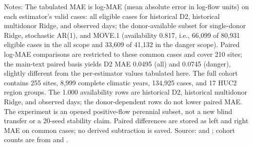 \begin{table}[t]
\centering
\small
\caption{Opened flow-comparator scorecard for the crossed family. Availability is the fraction of eligible cases with a valid estimate; MAE is mean absolute error in log-flow units computed on each estimator's valid cases. The ``all'' scope contains 80,931 eligible cases and the ``danger'' scope 41,132; paired log-MAE comparisons use 66,099 and 33,609 common cases, respectively.}
\label{tab:S8}
\par\smallskip\footnotesize Notes: The tabulated MAE is log-MAE (mean absolute error in log-flow units) on each estimator's valid cases: all eligible cases for historical D2, historical multidonor Ridge, and observed days; the donor-available subset for single-donor Ridge, stochastic AR(1), and MOVE.1 (availability 0.817, i.e., 66,099 of 80,931 eligible cases in the all scope and 33,609 of 41,132 in the danger scope). Paired log-MAE comparisons are restricted to these common cases and cover 210 sites; the main-text paired basis yields D2 MAE 0.0495 (all) and 0.0745 (danger), slightly different from the per-estimator values tabulated here. The full cohort contains 255 sites, 8,999 complete climatic years, 134,925 cases, and 17 HUC2 region groups. The 1.000 availability rows are historical D2, historical multidonor Ridge, and observed days; the donor-dependent rows do not lower paired MAE. The experiment is an opened positive-flow perennial subset, not a new blind transfer or a 20-seed stability claim. Paired differences are stored as left and right MAE on common cases; no derived subtraction is saved. Source:  and ; cohort counts are from  and .
\end{table}
